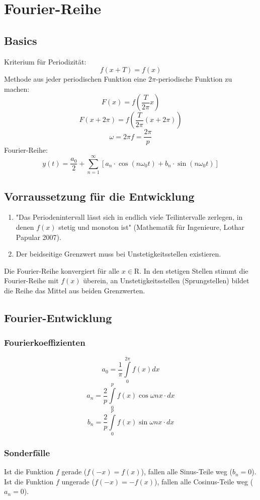 \documentclass[12pt,a4paper]{article}
\begin{document}
\section{Fourier-Reihe}
\subsection{Basics}
Kriterium für Periodizität:
\[f(x+T) = f(x)\]
Methode aus jeder periodischen Funktion eine $2\pi$-periodische Funktion zu machen:
\[F(x) = f(\frac{T}{2\pi}x)\]
\[F(x+2\pi) = f(\frac{T}{2\pi} ( x + 2\pi))\]
\[\omega = 2\pi f = \frac{2\pi}{p}\]
Fourier-Reihe:
\[y(t)=\frac{a_0}{2} + \sum\limits_{n=1}^{\infty}[a_n \cdot \cos{(n\omega_0 t)} + b_n \cdot \sin{(n \omega_0 t)}]\]

\subsection{Vorraussetzung für die Entwicklung}
\begin{enumerate}
\item
"Das Periodenintervall lässt sich in endlich viele Teilintervalle zerlegen, in denen $f(x)$ stetig und monoton ist" (Mathematik für Ingenieure, Lothar Papular 2007).
\item
Der beidseitige Grenzwert muss bei Unstetigkeitsstellen existieren.
\end{enumerate}
Die Fourier-Reihe konvergiert für alle $x \in \mathrm{R}$. In den stetigen Stellen stimmt die Fourier-Reihe mit $f(x)$ überein, an Unstetigkeitsstellen (Sprungstellen) bildet die Reihe das Mittel aus beiden Grenzwerten. 

\subsection{Fourier-Entwicklung}
\subsubsection{Fourierkoeffizienten}
\[a_0 = \frac{1}{\pi} \int\limits_0^{2\pi}{f(x)dx}\]
\[a_n = \frac{2}{p} \int\limits_0^p{f(x) \cos\omega n x \cdot dx}\]
\[b_n = \frac{2}{p} \int\limits_0^p{f(x) \sin\omega n x \cdot dx}\]

\subsubsection{Sonderfälle}
Ist die Funktion $f$ gerade ($f(-x) = f(x)$), fallen alle Sinus-Teile weg ($b_n = 0$).\\
Ist die Funktion $f$ ungerade ($f(-x) = -f(x)$), fallen alle Cosinus-Teile weg ($a_n = 0$).
\end{document}
